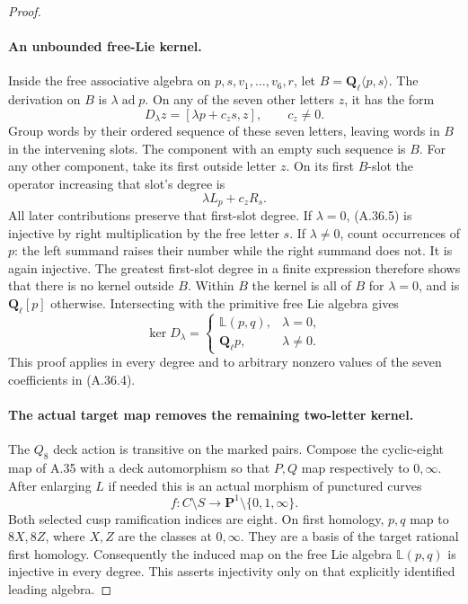 \begin{proof}
\paragraph{An unbounded free-Lie kernel.}
Inside the free associative algebra on \(p,s,v_1,\ldots,v_6,r\),
let \(B=\mathbf Q_\ell\langle p,s\rangle\).
The derivation on \(B\) is \(\lambda\operatorname{ad}p\).
On any of the seven other letters \(z\), it has the form
\[
                  D_\lambda z=[\lambda p+c_zs,z],
                 \qquad c_z\ne0.                        \tag{A.36.4}
\]
Group words by their ordered sequence of these seven
letters, leaving words in \(B\) in the intervening slots.
The component with an empty such sequence is \(B\).
For any other component, take its first outside letter
\(z\). On its first \(B\)-slot the operator increasing
that slot's degree is
\[
                      \lambda L_p+c_zR_s.                \tag{A.36.5}
\]
All later contributions preserve that first-slot degree.
If \(\lambda=0\), (A.36.5) is injective by right
multiplication by the free letter \(s\).
If \(\lambda\ne0\), count occurrences of \(p\):
the left summand raises their number while the right
summand does not. It is again injective.
The greatest first-slot degree in a finite expression
therefore shows that there is no kernel outside \(B\).
Within \(B\) the kernel is all of \(B\) for
\(\lambda=0\), and is \(\mathbf Q_\ell[p]\) otherwise.
Intersecting with the primitive free Lie algebra gives
\[
 \ker D_\lambda=
 \begin{cases}
    \mathbb L(p,q),&\lambda=0,\\
    \mathbf Q_\ell p,&\lambda\ne0 .
 \end{cases}                                             \tag{A.36.6}
\]
This proof applies in every degree and to arbitrary
nonzero values of the seven coefficients in (A.36.4).

\paragraph{The actual target map removes the remaining two-letter kernel.}
The \(Q_8\) deck action is transitive on the marked pairs.
Compose the cyclic-eight map of A.35 with a deck
automorphism so that \(P,Q\) map respectively to
\(0,\infty\). After enlarging \(L\) if needed this is
an actual morphism of punctured curves
\[
          f:C\setminus S\longrightarrow
                    \mathbf P^1\setminus\{0,1,\infty\}.
                                                        \tag{A.36.7}
\]
Both selected cusp ramification indices are eight.
On first homology, \(p,q\) map to \(8X,8Z\), where
\(X,Z\) are the classes at \(0,\infty\). They are a
basis of the target rational first homology.
Consequently the induced map on the free Lie algebra
\(\mathbb L(p,q)\) is injective in every degree.
This asserts injectivity only on that explicitly
identified leading algebra.


\end{proof}
